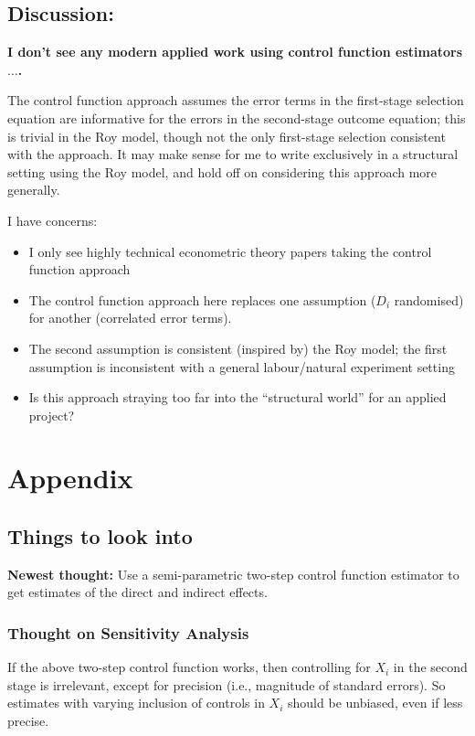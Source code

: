 \documentclass[a4paper, 12pt]{article}                                     %
\renewcommand{\vec}[1]{\boldsymbol{\mathit{#1}}}                           %
\begin{document}
\subsection{Discussion:}
\textbf{I don't see any modern applied work using control function estimators$\hdots$.}

The control function approach assumes the error terms in the first-stage selection equation are informative for the errors in the second-stage outcome equation; this is trivial in the Roy model, though not the only first-stage selection consistent with the approach.
It may make sense for me to write exclusively in a structural setting using the Roy model, and hold off on considering this approach more generally.

I have concerns:
\begin{itemize}
    \item I only see highly technical econometric theory papers taking the control function approach
    \item The control function approach here replaces one assumption ($D_i$ randomised) for another (correlated error terms).
    \item The second assumption is consistent (inspired by) the Roy model; the first assumption is inconsistent with a general labour/natural experiment setting
    \item Is this approach straying too far into the ``structural world'' for an applied project?
\end{itemize}

\newpage
\appendix
\setcounter{table}{0}
\renewcommand{\thetable}{A\arabic{table}}
\setcounter{figure}{0}
\renewcommand{\thefigure}{A\arabic{figure}}

\section{Appendix}
\label{appendix}
\subsection{Things to look into}

\textbf{Newest thought:} Use a semi-parametric two-step control function estimator to get estimates of the direct and indirect effects.

\subsubsection{Thought on Sensitivity Analysis}
If the above two-step control function works, then controlling for $\vec X_i$ in the second stage is irrelevant, except for precision (i.e., magnitude of standard errors).
So estimates with varying inclusion of controls in $\vec X_i$ should be unbiased, even if less precise.
\end{document}

